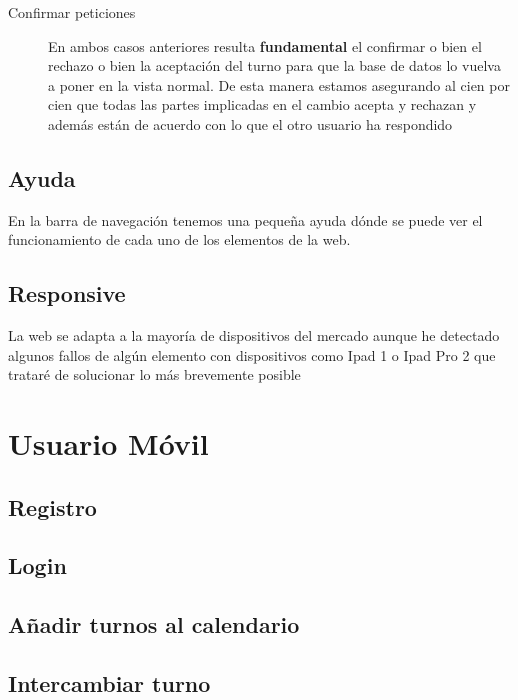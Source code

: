 \begin{description}
\begin{itemize}
\end{itemize}


\item[Confirmar peticiones]
En ambos casos anteriores resulta \textbf{fundamental} el confirmar o bien el rechazo o bien la aceptación del turno para que la base de datos lo vuelva a poner en la vista normal. De esta manera estamos asegurando al cien por cien que todas las partes implicadas en el cambio acepta y rechazan y además están de acuerdo con lo que el otro usuario ha respondido

\end{description}

\subsection{Ayuda}
En la barra de navegación tenemos una pequeña ayuda dónde se puede ver el funcionamiento de cada uno de los elementos de la web. 

\subsection{Responsive}
La web se adapta a la mayoría de dispositivos del mercado aunque he detectado algunos fallos de algún elemento con dispositivos como Ipad 1 o Ipad Pro 2 que trataré de solucionar lo más brevemente posible



\section{Usuario Móvil}


\subsection{Registro}

\subsection{Login}

\subsection{Añadir turnos al calendario}

\subsection{Intercambiar turno}

